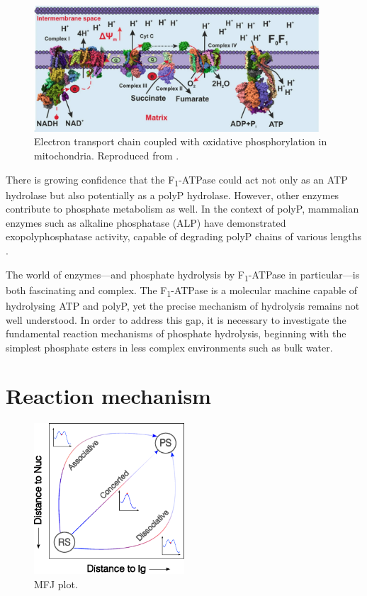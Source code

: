 \begin{figure}[t!]
    \centering
    \includegraphics[width=0.95\textwidth]{Figures/1_Introduction/intro_atp_synthase.pdf}
    \caption{Electron transport chain coupled with oxidative phosphorylation in mitochondria. Reproduced from \citep{baevInorganicPolyphosphateF0F1ATP2022}.}
    \label{fig:atp_synthase}
\end{figure}

There is growing confidence that the F\textsubscript{1}-ATPase could act not only as an ATP hydrolase but also potentially as a polyP hydrolase. However, other enzymes contribute to phosphate metabolism as well. In the context of polyP, mammalian enzymes such as alkaline phosphatase (ALP) have demonstrated exopolyphosphatase activity, capable of degrading polyP chains of various lengths \citep{baevInorganicPolyphosphateF0F1ATP2022}.

The world of enzymes—and phosphate hydrolysis by F\textsubscript{1}-ATPase in particular—is both fascinating and complex. The F\textsubscript{1}-ATPase is a molecular machine capable of hydrolysing ATP and polyP, yet the precise mechanism of hydrolysis remains not well understood. In order to address this gap, it is necessary to investigate the fundamental reaction mechanisms of phosphate hydrolysis, beginning with the simplest phosphate esters in less complex environments such as bulk water.



\section{Reaction mechanism}

\begin{figure}[htbp]
    \centering
    \includegraphics[width=0.5\textwidth]{Figures/1_Introduction/intro_mfj_plot.pdf}
    \caption{MFJ plot.}
    \label{fig:mfj_plot}
\end{figure}

